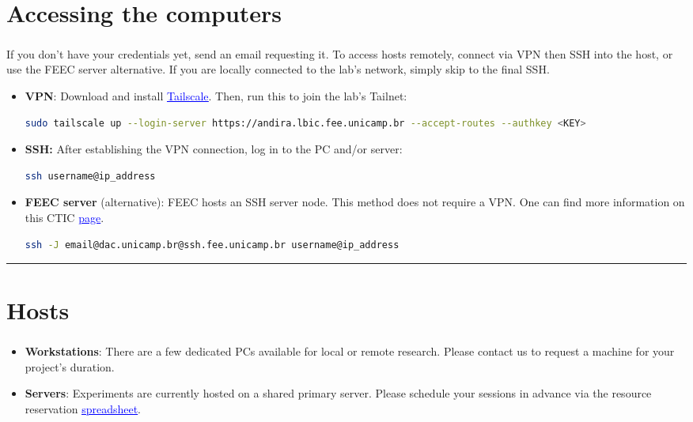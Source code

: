 \documentclass[a4paper, landscape]{article}
\begin{document}
\begin{multicols}{2}
\section*{Accessing the computers}
\label{sec:org9dee7b6}
\vspace{-2mm}
If you don't have your credentials yet, send an email\textsuperscript{\dag}  requesting it. To access hosts remotely, connect via VPN then SSH into the host, or use the FEEC server alternative. If you are locally connected to the lab's network, simply skip to the final SSH.
\begin{itemize}
\item \textbf{VPN}: Download and install \href{https://tailscale.com/download}{\textcolor{blue}{\uline{Tailscale}}}. Then, run this to join the lab's Tailnet:
\begin{lstlisting}[language=sh,numbers=none,basicstyle=\fontsize{7pt}{8.5pt}\ttfamily]
sudo tailscale up --login-server https://andira.lbic.fee.unicamp.br --accept-routes --authkey <KEY>
\end{lstlisting}
\vspace{-1mm}
\item \textbf{SSH:} After establishing the VPN connection, log in to the PC and/or server:
\begin{lstlisting}[language=sh,numbers=none]
ssh username@ip_address
\end{lstlisting}
\vspace{-1mm}
\item \textbf{FEEC server} (alternative): FEEC hosts an SSH server node. This method does not require a VPN. One can find more information on this CTIC \href{https://site.fee.unicamp.br/ctic/configuracao-de-sshfeeunicampbr-como-jump-host}{\textcolor{blue}{\uline{page}}}.
\begin{lstlisting}[language=sh,numbers=none]
ssh -J email@dac.unicamp.br@ssh.fee.unicamp.br username@ip_address
\end{lstlisting}
\end{itemize}
\vspace{-0.75em}\noindent\rule{\linewidth}{0.4pt}\vspace{-1.25em}
\section*{Hosts}
\label{sec:orge4bf5e2}
\vspace{-2mm}
\begin{itemize}
\item \textbf{Workstations}: There are a few dedicated PCs available for local or remote research. Please contact us\textsuperscript{\dag} to request a machine for your project's duration.
\item \textbf{Servers}: Experiments are currently hosted on a shared primary server. Please schedule your sessions in advance via the resource reservation \href{https://docs.google.com/spreadsheets/d/1Lhi5pEze4d4Z4oHMksUpD3k6n5Hp26gXtOMGz6sXr9A/edit?usp=sharing}{\textcolor{blue}{\uline{spreadsheet}}}.
\end{itemize}


\end{multicols}
\end{document}
